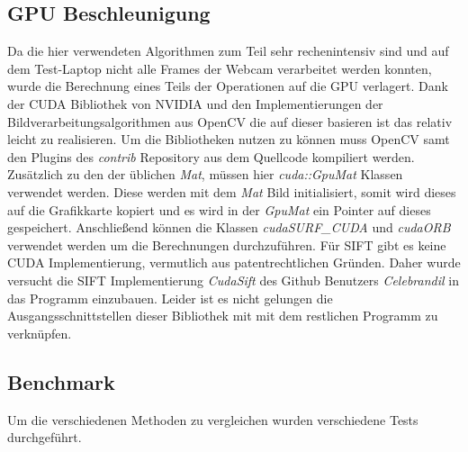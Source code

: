 \subsection{GPU Beschleunigung}

Da die hier verwendeten Algorithmen zum Teil sehr rechenintensiv sind und auf dem Test-Laptop nicht alle Frames der Webcam verarbeitet werden konnten, wurde die Berechnung eines Teils der Operationen auf die GPU verlagert.
Dank der CUDA Bibliothek von NVIDIA und den Implementierungen der Bildverarbeitungsalgorithmen aus OpenCV die auf dieser basieren ist das relativ leicht zu realisieren.
Um die Bibliotheken nutzen zu können muss OpenCV samt den Plugins des \emph{contrib} Repository aus dem Quellcode kompiliert werden.
Zusätzlich zu den der üblichen \emph{Mat}, müssen hier \emph{cuda::GpuMat} Klassen verwendet werden.
Diese werden mit dem \emph{Mat} Bild initialisiert, somit wird dieses auf die Grafikkarte kopiert und es wird in der \emph{GpuMat} ein Pointer auf dieses gespeichert.
Anschließend können die Klassen \emph{cuda\:\:SURF\_CUDA} und \emph{cuda\:\:ORB} verwendet werden um die Berechnungen durchzuführen.
Für SIFT gibt es keine CUDA Implementierung, vermutlich aus patentrechtlichen Gründen.
Daher wurde versucht die SIFT Implementierung \emph{CudaSift} des Github Benutzers \emph{Celebrandil} in das Programm einzubauen.
Leider ist es nicht gelungen die Ausgangsschnittstellen dieser Bibliothek mit mit dem restlichen Programm zu verknüpfen.

\subsection{Benchmark}

Um die verschiedenen Methoden zu vergleichen wurden verschiedene Tests durchgeführt.
